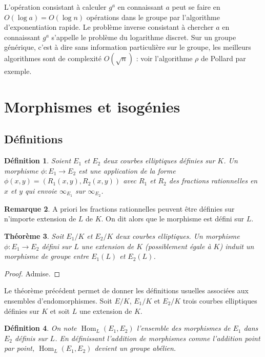 \documentclass{article}
\theoremstyle{plain}%
\newtheorem{thm}{Théorème}[section]
\newtheorem{deff}[thm]{Définition}
\theoremstyle{definition}%
\newtheorem{rem}[thm]{Remarque}
\DeclareMathOperator{\Hom}{Hom}
\begin{document}
L'opération consistant à calculer $g^a$ en connaissant $a$ peut se faire en $O(\log a) = O(\log n)$ opérations dans le groupe par l'algorithme d'exponentiation rapide. Le problème inverse consistant à chercher $a$ en connaissant $g^a$ s'appelle le problème du logarithme discret. Sur un groupe générique, c'est à dire sans information particulière sur le groupe, les meilleurs algorithmes sont de complexité $O(\sqrt{n})$ : voir l'algorithme $\rho$ de Pollard par exemple.



\section{Morphismes et isogénies}

\subsection{Définitions}

\begin{deff}
  Soient $E_1$ et $E_2$ deux courbes elliptiques définies sur $K$. Un morphisme $\phi : E_1\to  E_2$ est une application de la forme $\phi(x, y) = (R_1(x, y), R_2(x, y))$ avec $R_1$ et $R_2$ des fractions rationnelles en $x$ et $y$ qui envoie $\infty_{E_1}$ sur $\infty_{E_2}$.
\end{deff}

\begin{rem}
  A priori les fractions rationnelles peuvent être définies sur n'importe extension de $L$ de $K$. On dit alors que le morphisme est défini sur $L$.
\end{rem}

\begin{thm}
  Soit $E_1/K$ et $E_2/K$ deux courbes elliptiques. Un morphisme $\phi : E_1\to  E_2$ défini sur $L$ une extension de $K$ (possiblement égale à $K$) induit un morphisme de groupe entre $E_1(L)$ et $E_2(L)$. 
\end{thm}

\begin{proof}
  Admise. 
\end{proof}

Le théorème précédent permet de donner les définitions usuelles associées aux ensembles d'endomorphismes. Soit $E/K$, $E_1/K$ et $E_2/K$ trois courbes elliptiques définies sur $K$ et soit $L$ une extension de $K$.

\begin{deff}
  On note $\Hom_L(E_1, E_2)$ l'ensemble des morphismes de $E_1$ dans $E_2$ définis sur $L$. En définissant l'addition de morphismes comme l'addition point par point, $\Hom_L(E_1, E_2)$ devient un groupe abélien.
\end{deff}
\end{document}
